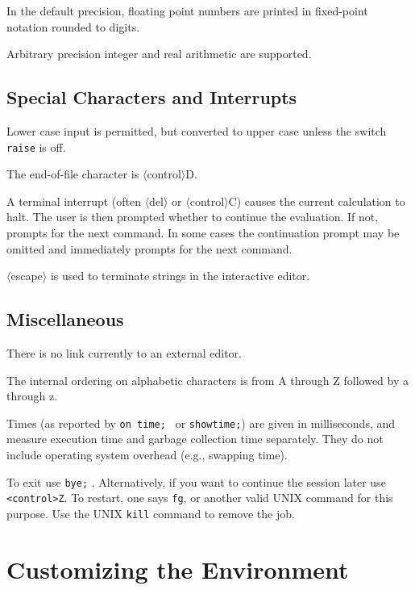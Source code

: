 In the default precision, floating point numbers are printed in
fixed-point notation rounded to {\floatingpointdigits} digits.

Arbitrary precision integer and real arithmetic are supported.

\subsection{Special Characters and Interrupts}
Lower case input is permitted, but converted to upper case unless the
switch {\tt raise} is off.

The end-of-file character is $\langle$control$\rangle$D.

A terminal interrupt (often $\langle$del$\rangle$ or
$\langle$control$\rangle$C) causes the current calculation to halt.  The
user is then prompted whether to continue the evaluation.  If not,
{\REDUCE} prompts for the next command.  In some cases the continuation
prompt may be omitted and {\REDUCE} immediately prompts for the next
command.

$\langle$escape$\rangle$ is used to terminate strings in the {\REDUCE}
interactive editor.

\subsection{Miscellaneous}
There is no link currently to an external editor.

The internal ordering on alphabetic characters is from A through Z
followed by a through z.

Times (as reported by {\tt on time; } or {\tt showtime;}) are given in
milliseconds, and measure execution time and garbage collection
time separately.  They do not include operating system overhead 
(e.g., swapping time).

To exit {\REDUCE} use {\tt bye;} .  Alternatively, if
you want to continue the {\REDUCE}
session later use {\tt <control>Z}.  To restart, one says
{\tt fg}, or another valid UNIX command for this purpose.  Use the UNIX
{\tt kill} command to remove the job.

\section{Customizing the {\REDUCE} Environment}

